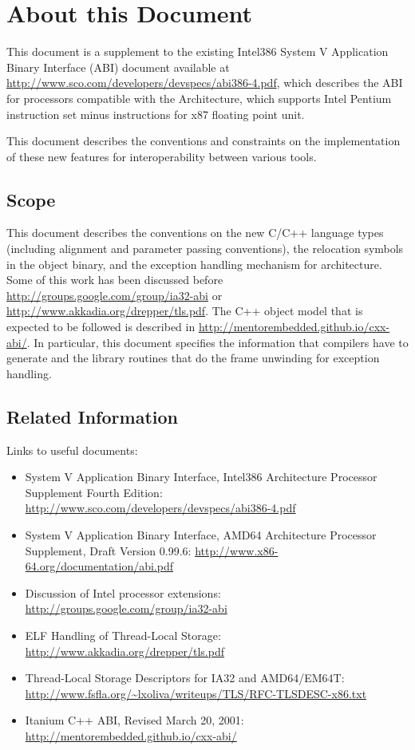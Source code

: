 \chapter{About this Document\label{intro}}

This document is a supplement to the existing Intel386 System V
Application Binary Interface (ABI) document available at
\url{http://www.sco.com/developers/devspecs/abi386-4.pdf},
which describes the ABI for processors compatible with the
\xARCH Architecture, which supports Intel Pentium instruction set
minus instructions for x87 floating point unit.

This document describes the conventions and constraints on the
implementation of these new features for interoperability between
various tools.

\section{Scope}

This document describes the conventions on the new C/C++ language types
(including alignment and parameter passing conventions), the relocation
symbols in the object binary, and the exception handling mechanism for
\xARCH architecture.  Some of this work has been discussed before
\url{http://groups.google.com/group/ia32-abi} or
\url{http://www.akkadia.org/drepper/tls.pdf}. The C++ object model that
is expected to be followed is described in
\url{http://mentorembedded.github.io/cxx-abi/}.  In particular,
this document specifies the information that compilers have to generate
and the library routines that do the frame unwinding for exception
handling.

\section{Related Information}

Links to useful documents:
\begin{itemize}
 \item System V Application Binary Interface, Intel386{\texttrademark} Architecture
       Processor Supplement Fourth Edition:
       \url{http://www.sco.com/developers/devspecs/abi386-4.pdf}
 \item System V Application Binary Interface, AMD64 Architecture Processor
       Supplement, Draft Version 0.99.6:
       \url{http://www.x86-64.org/documentation/abi.pdf}
 \item Discussion of Intel processor extensions:
       \url{http://groups.google.com/group/ia32-abi}
 \item ELF Handling of Thread-Local Storage:
       \url{http://www.akkadia.org/drepper/tls.pdf}
 \item Thread-Local Storage Descriptors for IA32 and AMD64/EM64T:
       \url{http://www.fsfla.org/~lxoliva/writeups/TLS/RFC-TLSDESC-x86.txt}
 \item Itanium C++ ABI, Revised March 20, 2001:
       \url{http://mentorembedded.github.io/cxx-abi/}
\end{itemize}

